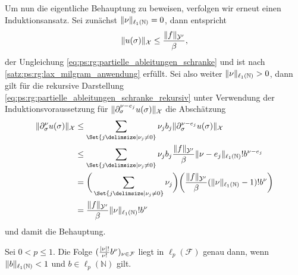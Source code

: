\begin{Satz}
\begin{Beweis}
        Um nun die eigentliche Behauptung zu beweisen, verfolgen wir erneut einen Induktionsansatz.
        Sei zunächst $\lVert\nu\rVert_{\ell_{1}(\mathbb{N})} = 0$, dann entspricht
        \begin{equation}
            \lVert u(\sigma)\rVert_{\mathcal X} \leq \frac{\lVert f\rVert_{\mathcal Y'}}{\beta},
        \end{equation}
        der Ungleichung \cref{eq:ps:rg:partielle_ableitungen_schranke} und ist nach \cref{satz:ps:rg:lax_milgram_anwendung} erfüllt.
        Sei also weiter $\lVert\nu\rVert_{\ell_{1}(\mathbb{N})} > 0$, dann gilt für die rekursive Darstellung \cref{eq:ps:rg:partielle_ableitungen_schranke_rekursiv} unter Verwendung der Induktionsvoraussetzung für $\lVert\partial^{\nu - e_{j}}_{\sigma} u(\sigma)\rVert_{\mathcal X}$ die Abschätzung
        \begin{align}
            \norm{\partial^{\nu}_{\sigma} u(\sigma)}_{\mathcal X}
            &\leq
            \sum_{\Set{j \given \nu_{j} \neq 0}} \nu_{j} b_{j} \norm{\partial^{\nu - e_{j}}_{\sigma} u(\sigma)}_{\mathcal X}
            \\&\leq
            \sum_{\Set{j \given \nu_{j} \neq 0}} \nu_{j} b_{j} \frac{\norm{f}_{\mathcal Y'}}{\beta} \norm{\nu - e_{j}}_{\ell_{1}(\mathbb{N})}! b^{\nu - e_{j}}
            \\&=
            \bigg( \sum_{\Set{j \given \nu_{j} \neq 0}} \nu_{j} \bigg) \bigg( \frac{\norm{f}_{\mathcal Y'}}{\beta} (\norm{\nu}_{\ell_{1}(\mathbb{N})} - 1)! b^{\nu} \bigg)
            \\&=
            \frac{\norm{f}_{\mathcal Y'}}{\beta} \norm{\nu}_{\ell_{1}(\mathbb{N})}! b^{\nu}
         \end{align}
         und damit die Behauptung.
    \end{Beweis}
\end{Satz}

\begin{Satz}
    Sei $0 < p \leq 1$.
    Die Folge $(\frac{\lvert\nu\rvert!}{\nu!} b^{\nu})_{\nu \in \mathcal F}$ liegt in $\ell_{p}(\mathcal F)$ genau dann, wenn $\lVert b\rVert_{\ell_{1}(\mathbb{N})} < 1$ und $b \in \ell_{p}(\mathbb{N})$ gilt.
\end{Satz}

